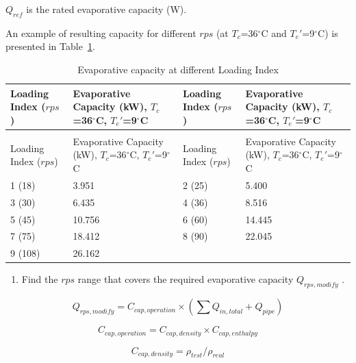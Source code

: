 $Q_{ref}$ is the rated evaporative capacity (W).

An example of resulting capacity for different $rps$ (at $T_c$=36\(^{\circ}\)C and ${T_e}'$=9\(^{\circ}\)C) is presented in Table~\ref{table:evaporative-capacity-at-different-loading-index}.

\begin{longtable}[c]{>{\raggedright}p{1.5in}>{\raggedright}p{1.5in}>{\raggedright}p{1.5in}>{\raggedright}p{1.5in}}
\caption{Evaporative capacity at different Loading Index \label{table:evaporative-capacity-at-different-loading-index}} \tabularnewline
\toprule
Loading Index ($rps$) & Evaporative Capacity (kW), $T_c$=36\(^{\circ}\)C, ${T_e}'$=9\(^{\circ}\)C & Loading Index ($rps$) & Evaporative Capacity (kW), $T_c$=36\(^{\circ}\)C, ${T_e}'$=9\(^{\circ}\)C \tabularnewline
\midrule
\endfirsthead

\caption[]{Evaporative capacity at different Loading Index} \tabularnewline
\toprule
Loading Index ($rps$) & Evaporative Capacity (kW), $T_c$=36\(^{\circ}\)C, ${T_e}'$=9\(^{\circ}\)C & Loading Index ($rps$) & Evaporative Capacity (kW), $T_c$=36\(^{\circ}\)C, ${T_e}'$=9\(^{\circ}\)C \tabularnewline
\midrule
\endhead

1 (18)  & 3.951  & 2 (25) & 5.400  \tabularnewline
3 (30)  & 6.435  & 4 (36) & 8.516  \tabularnewline
5 (45)  & 10.756 & 6 (60) & 14.445 \tabularnewline
7 (75)  & 18.412 & 8 (90) & 22.045 \tabularnewline
9 (108) & 26.162 &        &        \tabularnewline
\bottomrule
\end{longtable}

\begin{enumerate}
\def\labelenumi{\alph{enumi}.}
\setcounter{enumi}{1}
\tightlist
\item
  Find the \(rps\) range that covers the required evaporative capacity \(Q_{rps,modify}\) .
\end{enumerate}

\begin{equation}
Q_{rps,modify} = C_{cap,operation}\times(\sum{Q_{in,total}}+Q_{pipe})
\end{equation}

\begin{equation}
C_{cap,operation} = C_{cap,density}\times{C_{cap,enthalpy}}
\end{equation}

\begin{equation}
C_{cap,density} = \rho_{test}/\rho_{real}
\end{equation}

